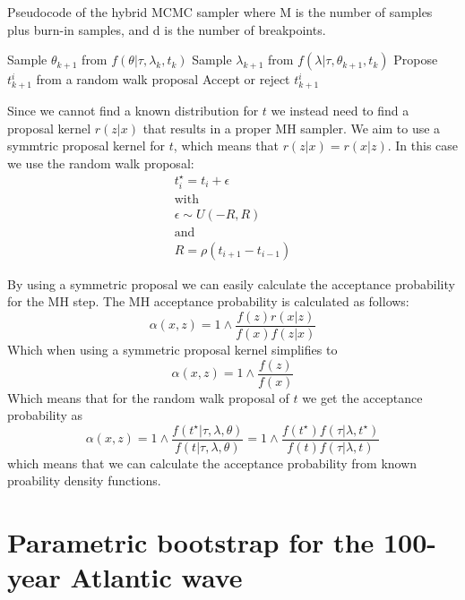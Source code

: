 \documentclass[a4paper]{article}
\begin{document}
\begin{algorithm}
    \caption{Pseudocode of the hybrid MCMC sampler where M is the number of samples plus burn-in samples, and d is the number of breakpoints.}
    \begin{algorithmic}
        \State Sample $\theta_{k+1}$ from $f(\theta|\tau, \lambda_k, t_k)$
        \State Sample $\lambda_{k+1}$ from $f(\lambda|\tau, \theta_{k+1}, t_k)$
        \State Propose $t_{k+1}^i$ from a random walk proposal
        \State Accept or reject $t_{k+1}^i$
        \EndFor
        \EndFor
    \end{algorithmic}
\end{algorithm}

Since we cannot find a known distribution for $t$ we instead need to find a proposal kernel $r(z|x)$ that results in a proper MH sampler. We aim to use a symmtric proposal kernel for $t$, which means that $r(z|x) = r(x|z)$. In this case we use the random walk proposal:
\begin{gather*}
    t_i^\star = t_i + \epsilon \\
    \text{with} \\
    \epsilon \sim U(-R,R) \\
    \text{and} \\
    R = \rho(t_{i+1}-t_{i-1})
\end{gather*}

By using a symmetric proposal we can easily calculate the acceptance probability for the MH step. The MH acceptance probability is calculated as follows:
\begin{equation}
    \alpha(x,z) = 1 \wedge \frac{f(z)r(x|z)}{f(x)f(z|x)}
\end{equation}
Which when using a symmetric proposal kernel simplifies to
\begin{equation}
    \alpha(x,z) = 1 \wedge \frac{f(z)}{f(x)}
\end{equation}
Which means that for the random walk proposal of $t$ we get the acceptance probability as
\begin{equation}
    \alpha(x,z) = 1 \wedge \frac{f(t^\star | \tau, \lambda, \theta)}{f(t | \tau, \lambda, \theta)} = 1 \wedge \frac{f(t^\star)f(\tau|\lambda,t^\star)}{f(t)f(\tau|\lambda,t)}
\end{equation}
which means that we can calculate the acceptance probability from known proability density functions.

\newpage

\section{Parametric bootstrap for the 100-year Atlantic wave}
\end{document}
